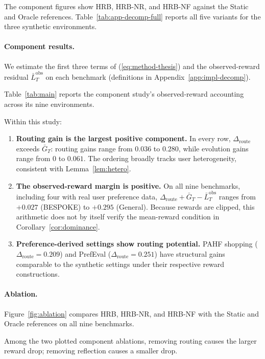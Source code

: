 \documentclass{article} %
\renewcommand{\eqref}[1]{\textup{(\ref{#1})}}
\begin{document}
The component figures show HRB, HRB-NR, and HRB-NF against the Static
and Oracle references. Table~\ref{tab:app-decomp-full} reports all five
variants for the three synthetic environments.

\paragraph{Component results.}

\label{sec:exp-results}

We estimate the first three terms of \eqref{eq:method-thesis} and the observed-reward residual \(\bar L_T^{\mathrm{obs}}\) on each benchmark (definitions in Appendix~\ref{app:impl-decomp}).

Table~\ref{tab:main} reports the component study's observed-reward
accounting across its nine environments.

Within this study:

\begin{enumerate}
\item \textbf{Routing gain is the largest positive component.} In every row, $\Delta_{\mathrm{route}}$ exceeds $\bar G_T$: routing gains range from $0.036$ to $0.280$, while evolution gains range from $0$ to $0.061$. The ordering broadly tracks user heterogeneity, consistent with Lemma~\ref{lem:hetero}.
\item \textbf{The observed-reward margin is positive.} On all nine benchmarks, including four with real user preference data, $\Delta_{\mathrm{route}}+\bar G_T-\bar L_T^{\mathrm{obs}}$ ranges from $+0.027$ (BESPOKE) to $+0.295$ (General). Because rewards are clipped, this arithmetic does not by itself verify the mean-reward condition in Corollary~\ref{cor:dominance}.
\item \textbf{Preference-derived settings show routing potential.}
PAHF shopping ($\Delta_{\mathrm{route}}{=}0.209$) and PrefEval
($\Delta_{\mathrm{route}}{=}0.251$) have structural gains comparable to the
synthetic settings under their respective reward constructions.
\end{enumerate}

\paragraph{Ablation.} Figure~\ref{fig:ablation} compares HRB, HRB-NR, and
HRB-NF with the Static and Oracle references on all nine benchmarks.

Among the two plotted component ablations, removing routing causes the larger
reward drop; removing reflection causes a smaller drop.
\end{document}
